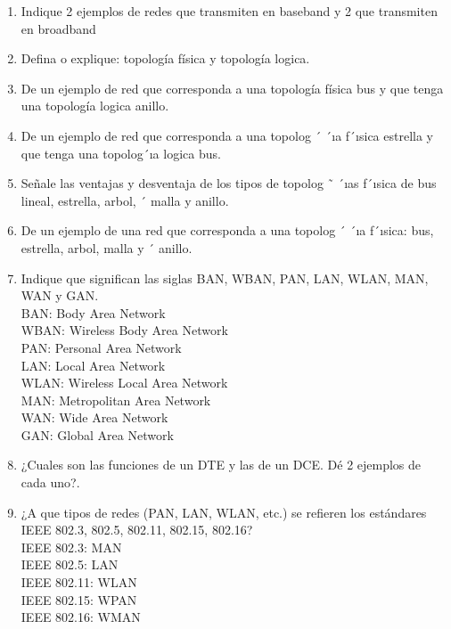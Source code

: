 \documentclass{udparticle}
\begin{document}
\begin{enumerate}
\item Indique 2 ejemplos de redes que transmiten en baseband y 2 que transmiten en broadband\\

\item Defina o explique: topología física y topología logica. \\

\item De un ejemplo de red que corresponda a una topología física bus y que tenga una topología
logica anillo.\\

\item De un ejemplo de red que corresponda a una topolog ´ ´ıa f´ısica estrella y que tenga una topolog´ıa
logica bus.

\item Señale las ventajas y desventaja de los tipos de topolog ˜ ´ıas f´ısica de bus lineal, estrella, arbol, ´
malla y anillo.

\item De un ejemplo de una red que corresponda a una topolog ´ ´ıa f´ısica: bus, estrella, arbol, malla y ´
anillo.\\

\item Indique que significan las siglas BAN, WBAN, PAN, LAN, WLAN, MAN, WAN y GAN.\\
    BAN: Body Area Network\\
    WBAN: Wireless Body Area Network\\
    PAN: Personal Area Network\\
    LAN: Local Area Network\\
    WLAN: Wireless Local Area Network\\
    MAN: Metropolitan Area Network\\
    WAN: Wide Area Network\\
    GAN: Global Area Network\\


\item ¿Cuales son las funciones de un DTE y las de un DCE. Dé 2 ejemplos de cada uno?.\\

\item ¿A que tipos de redes (PAN, LAN, WLAN, etc.) se refieren los estándares IEEE 802.3, 802.5,
802.11, 802.15, 802.16?\\
    IEEE 802.3: MAN\\
    IEEE 802.5: LAN\\
    IEEE 802.11: WLAN\\
    IEEE 802.15: WPAN\\
    IEEE 802.16: WMAN\\


\end{enumerate}
\end{document}
